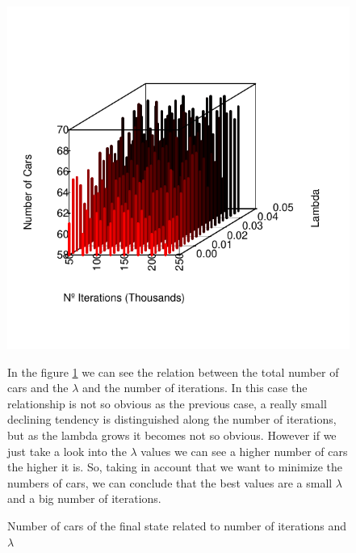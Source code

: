 \documentclass[12]{article}
\begin{document}
    \begin{figure}
    \captionsetup{justification=centering}
   		\centering
        \includegraphics[scale=0.45]{Results/data_B_2.pdf}
        \caption{Number of cars of the final state related to number of iterations and $\lambda$}
        \label{fig:data3}
        
        \vspace{1cm}
In the figure \ref{fig:data3} we can see the relation between the total number of cars and the $\lambda$ and the number of iterations. In this case the relationship is not so  obvious as the previous case, a really small declining tendency is distinguished along the number of iterations, but as the lambda grows it becomes not so obvious. However if we just take a look into the $\lambda$ values we can see a higher number of cars the higher it is. So, taking in account that we want to minimize the numbers of cars, we can conclude that the best values are a small $\lambda$ and a big number of iterations. 
        
        \end{figure}
\end{document}
